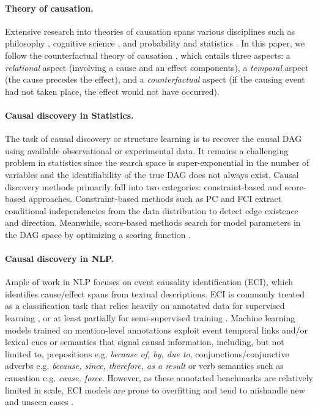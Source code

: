 \paragraph{Theory of causation.} Extensive research into theories of causation spans various disciplines \citep{dalal2023calm} such as philosophy \citep{beebee2009oxford}, cognitive science \citep{waldmann2017oxford}, and probability and statistics \citep{pearl2009causality}. In this paper, we follow the counterfactual theory of causation \citep{lewis2013counterfactuals}, which entails three aspects: a \textit{relational} aspect (involving a cause and an effect components), a \textit{temporal} aspect (the cause precedes the effect), and a \textit{counterfactual} aspect (if the causing event had not taken place, the effect would not have occurred). 

\paragraph{Causal discovery in Statistics.} The task of causal discovery or structure learning is to recover the causal DAG using available observational or experimental data. It remains a challenging problem in statistics since the search space is super-exponential in the number of variables and the identifiability of the true DAG does not always exist. Causal discovery methods primarily fall into two categories: constraint-based and score-based approaches.  Constraint-based methods such as PC \cite{spirtes1991algorithm} and FCI \cite{spirtes2000causation} extract conditional independencies from the data distribution to detect edge existence and direction. Meanwhile, score-based methods search for model parameters in the DAG space by optimizing a scoring function \cite{chickering2002optimal,zheng2018dags,yu2019dag,bello2022dagma}.


\paragraph{Causal discovery in NLP.} Ample of work in NLP focuses on event causality identification (ECI), which identifies cause/effect spans from textual descriptions. ECI is commonly treated as a classification task that relies heavily on annotated data for supervised learning \cite{oh2013question, hashimoto2014toward, riaz2014recognizing, cheng2017classifying, gao2019modeling}, or at least partially for semi-supervised training \cite{zuo-etal-2021-improving, shen-etal-2022-event}. Machine learning models trained on mention-level annotations exploit event temporal links \cite{pustejovsky2003timebank, pustejovsky2006timebank} and/or lexical cues or semantics that signal causal information, including, but not limited to, prepositions e.g. \textit{because of, by, due to}, conjunctions/conjunctive adverbs e.g. \textit{because, since, therefore, as a result} or verb semantics \cite{wolff2003models, mirza-tonelli-2014-analysis} such as causation e.g. \textit{cause, force}. However, as these annotated benchmarks are relatively limited in scale, ECI models are prone to overfitting and tend to mishandle new and unseen cases \citep{zuo-etal-2021-improving, sun2023event}. 


